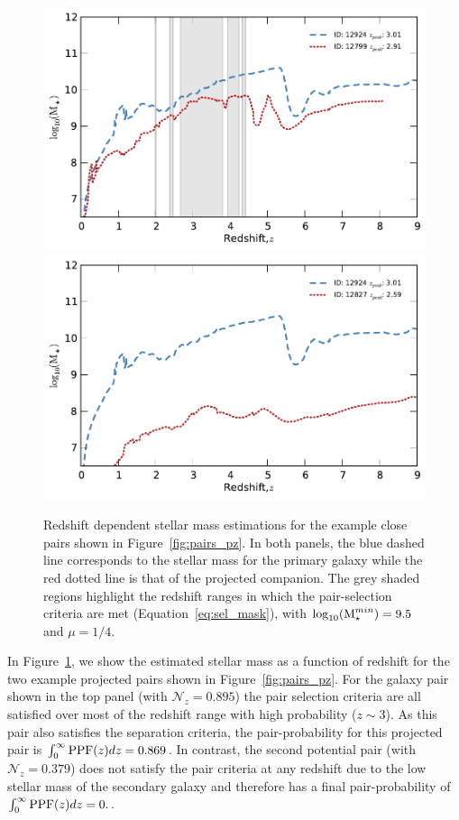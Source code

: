\begin{figure}
\centering
\includegraphics[width=0.9\columnwidth]{plots/PairsMass_pri_81_2.pdf}
\includegraphics[width=0.9\columnwidth]{plots/PairsMass_pri_81_4.pdf}
  
  \caption[Redshift dependent stellar mass estimations for the example close pairs shown in Figure~\ref{fig:pairs_pz}.]{Redshift dependent stellar mass estimations for the example close pairs shown in Figure~\ref{fig:pairs_pz}. In both panels, the blue dashed line corresponds to the stellar mass for the primary galaxy while the red dotted line is that of the projected companion. The grey shaded regions highlight the redshift ranges in which the pair-selection criteria are met (Equation~\ref{eq:sel_mask}), with $\log_{10}(\text{M}_{\star}^{min}) = 9.5$ and $\mu = 1/4$.}
  \label{fig:pairs_mass}
\end{figure}

In Figure~\ref{fig:pairs_mass}, we show the estimated stellar mass as a function of redshift for the two example projected pairs shown in Figure~\ref{fig:pairs_pz}. For the galaxy pair shown in the top panel (with $\mathcal{N}_{z} = 0.895$) the pair selection criteria are all satisfied over most of the redshift range with high probability ($z\sim3$). As this pair also satisfies the separation criteria, the pair-probability for this projected pair is $\int_{0}^{\infty} \textup{PPF}(z) dz = 0.869$. In contrast, the second potential pair (with $\mathcal{N}_{z} = 0.379$) does not satisfy the pair criteria at any redshift due to the low stellar mass of the secondary galaxy and therefore has a final pair-probability of $\int_{0}^{\infty} \textup{PPF}(z) dz = 0.$.

